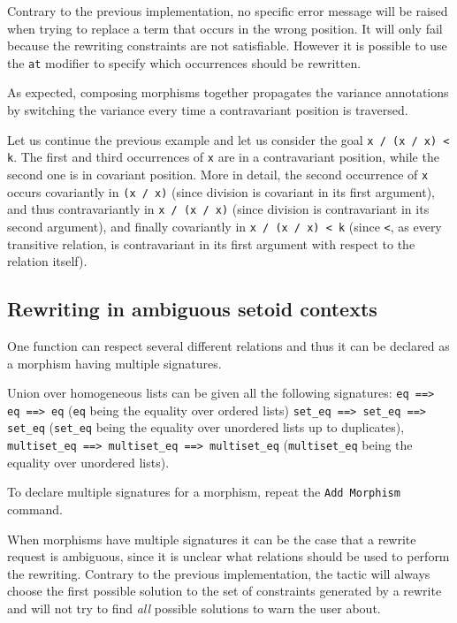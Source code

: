 Contrary to the previous implementation, no specific error message will
be raised when trying to replace a term that occurs in the wrong
position. It will only fail because the rewriting constraints are not
satisfiable. However it is possible to use the \texttt{at} modifier to
specify which occurrences should be rewritten.

As expected, composing morphisms together propagates the variance annotations by
switching the variance every time a contravariant position is traversed.
\begin{cscexample}
Let us continue the previous example and let us consider the goal
\texttt{x / (x / x) < k}. The first and third occurrences of \texttt{x} are
in a contravariant position, while the second one is in covariant position.
More in detail, the second occurrence of \texttt{x} occurs
covariantly in \texttt{(x / x)} (since division is covariant in its first
argument), and thus contravariantly in \texttt{x / (x / x)} (since division
is contravariant in its second argument), and finally covariantly in
\texttt{x / (x / x) < k} (since \texttt{<}, as every transitive relation,
is contravariant in its first argument with respect to the relation itself).
\end{cscexample}

\subsection{Rewriting in ambiguous setoid contexts}
One function can respect several different relations and thus it can be
declared as a morphism having multiple signatures.

\begin{cscexample}
Union over homogeneous lists can be given all the following signatures:
\texttt{eq ==> eq ==> eq} (\texttt{eq} being the equality over ordered lists)
\texttt{set\_eq ==> set\_eq ==> set\_eq} (\texttt{set\_eq} being the equality
over unordered lists up to duplicates),
\texttt{multiset\_eq ==> multiset\_eq ==> multiset\_eq} (\texttt{multiset\_eq}
being the equality over unordered lists).
\end{cscexample}

To declare multiple signatures for a morphism, repeat the \texttt{Add Morphism}
command.

When morphisms have multiple signatures it can be the case that a rewrite
request is ambiguous, since it is unclear what relations should be used to
perform the rewriting. Contrary to the previous implementation, the
tactic will always choose the first possible solution to the set of
constraints generated by a rewrite and will not try to find \emph{all}
possible solutions to warn the user about.


